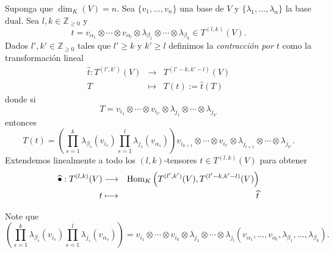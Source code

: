 \begin{defn}
Suponga que $\dim_K(V)=n$. Sea $\{v_1,\ldots,v_n\}$ una base de $V$ y $\{\lambda_1,\ldots,\lambda_n\}$ la base dual. Sea $l,k\in\mathbb{Z}_{\ge 0}$ y
$$t=v_{\alpha_1}\otimes\cdots\otimes v_{\alpha_l}\otimes\lambda_{\beta_1}\otimes\cdots\otimes\lambda_{\beta_k}\in T^{(l,k)}(V).$$
Dados $l',k'\in\mathbb{Z}_{\ge 0}$ tales que $l'\ge k$ y $k'\ge l$ definimos la \emph{contracci\'on por $t$} como la transformaci\'on lineal
\begin{eqnarray*}
\widehat{t}: T^{(l',k')}(V) & \longrightarrow & T^{(l'-k,k'-l)}(V)\\
T & \longmapsto & T(t):=\widehat{t}(T)
\end{eqnarray*} 
donde si
$$T=v_{i_1}\otimes\cdots\otimes v_{i_{l'}}\otimes\lambda_{j_1}\otimes\cdots\otimes\lambda_{j_{k'}}$$
entonces
$$T(t)=\left(\prod_{s=1}^k\lambda_{\beta_s}(v_{i_s})\prod_{s=1}^l\lambda_{j_s}(v_{\alpha_s})\right)v_{i_{k+1}}\otimes\cdots\otimes v_{i_{l'}}\otimes\lambda_{j_{l+1}}\otimes\cdots\otimes\lambda_{j_{k'}}.$$
Extendemos linealmente a todo los $(l,k)$-tensores $t\in T^{(l,k)}(V)$ para obtener
\begin{eqnarray*}
\widehat{\bullet}: T^{(l,k)}(V) & \longrightarrow & \operatorname{Hom}_K\left(T^{(l',k')}(V), T^{(l'-k,k'-l)}(V)\right)\\
t & \longmapsto & \widehat{t}
\end{eqnarray*}
\end{defn}

\begin{obs}
Note que $$\left(\prod_{s=1}^k\lambda_{\beta_s}(v_{i_s})\prod_{s=1}^l\lambda_{j_s}(v_{\alpha_s})\right)=v_{i_1}\otimes\cdots\otimes v_{i_k}\otimes\lambda_{j_1}\otimes\cdots\otimes\lambda_{j_l}(v_{\alpha_1},\ldots, v_{\alpha_l},\lambda_{\beta_1},\ldots,\lambda_{\beta_k}).$$
\end{obs}

